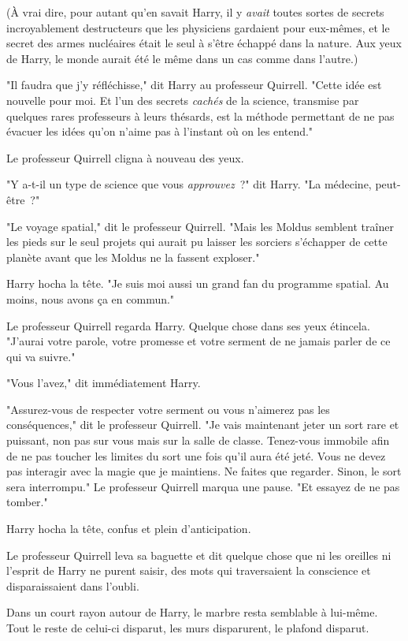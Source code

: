 (À vrai dire, pour autant qu'en savait Harry, il y \emph{avait} toutes sortes de secrets incroyablement destructeurs que les physiciens gardaient pour eux-mêmes, et le secret des armes nucléaires était le seul à s'être échappé dans la nature. Aux yeux de Harry, le monde aurait été le même dans un cas comme dans l'autre.)

"Il faudra que j'y réfléchisse," dit Harry au professeur Quirrell. "Cette idée est nouvelle pour moi. Et l'un des secrets \emph{cachés} de la science, transmise par quelques rares professeurs à leurs thésards, est la méthode permettant de ne pas évacuer les idées qu'on n'aime pas à l'instant où on les entend."

Le professeur Quirrell cligna à nouveau des yeux.

"Y a-t-il un type de science que vous \emph{approuvez}~?" dit Harry. "La médecine, peut-être~?"

"Le voyage spatial," dit le professeur Quirrell. "Mais les Moldus semblent traîner les pieds sur le seul projets qui aurait pu laisser les sorciers s'échapper de cette planète avant que les Moldus ne la fassent exploser."

Harry hocha la tête. "Je suis moi aussi un grand fan du programme spatial. Au moins, nous avons ça en commun."

Le professeur Quirrell regarda Harry. Quelque chose dans ses yeux étincela. "J'aurai votre parole, votre promesse et votre serment de ne jamais parler de ce qui va suivre."

"Vous l'avez," dit immédiatement Harry.

"Assurez-vous de respecter votre serment ou vous n'aimerez pas les conséquences," dit le professeur Quirrell. "Je vais maintenant jeter un sort rare et puissant, non pas sur vous mais sur la salle de classe. Tenez-vous immobile afin de ne pas toucher les limites du sort une fois qu'il aura été jeté. Vous ne devez pas interagir avec la magie que je maintiens. Ne faites que regarder. Sinon, le sort sera interrompu." Le professeur Quirrell marqua une pause. "Et essayez de ne pas tomber."

Harry hocha la tête, confus et plein d'anticipation.

Le professeur Quirrell leva sa baguette et dit quelque chose que ni les oreilles ni l'esprit de Harry ne purent saisir, des mots qui traversaient la conscience et disparaissaient dans l'oubli.

Dans un court rayon autour de Harry, le marbre resta semblable à lui-même. Tout le reste de celui-ci disparut, les murs disparurent, le plafond disparut.

